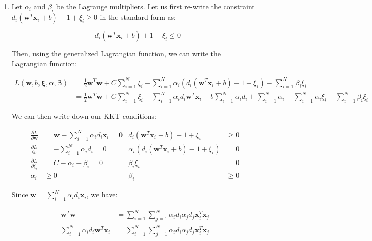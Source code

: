 \documentclass[11pt,fancychapters]{article}
\begin{document}
\begin{enumerate}[label=\textbf{\arabic*)}]

\item Let $\alpha_i$ and $\beta_i$ be the Lagrange multipliers. Let us first re-write the constraint $d_i(\mathbf{w}^T\mathbf{x}_i + b) - 1 + \xi_i \ge 0$ in the standard form as:

\begin{equation*}
	-d_i(\mathbf{w}^T\mathbf{x}_i + b) + 1 - \xi_i \le 0
\end{equation*}

Then, using the generalized Lagrangian function, we can write the Lagrangian function:

\begin{equation*}
	\begin{split}
	L(\mathbf{w}, b, \mathbf{\xi}, \bm{\alpha}, \bm{\beta}) & = \frac{1}{2} \mathbf{w}^T\mathbf{w} + C\sum_{i=1}^{N}\xi_i - \sum_{i=1}^{N}\alpha_i \left( d_i(\mathbf{w}^T\mathbf{x}_i + b) - 1 + \xi_i \right) - \sum_{i=1}^{N}\beta_i \xi_i \\
	& = \frac{1}{2} \mathbf{w}^T\mathbf{w} + C\sum_{i=1}^{N}\xi_i - \sum_{i=1}^{N}\alpha_i d_i \mathbf{w}^T \mathbf{x}_i - b \sum_{i=1}^{N}\alpha_i d_i + \sum_{i=1}^{N}\alpha_i - \sum_{i=1}^{N}\alpha_i \xi_i - \sum_{i=1}^{N}\beta_i \xi_i
	\end{split}
\end{equation*}

We can then write down our KKT conditions:

\begin{align*}
\frac{\partial L}{\partial \mathbf{w}} &= \mathbf{w} - \sum_{i=1}^{N}\alpha_i d_i \mathbf{x}_i = \mathbf{0} & d_i(\mathbf{w}^T\mathbf{x}_i + b) - 1 + \xi_i &\ge 0 \\
\frac{\partial L}{\partial b} &= - \sum_{i=1}^{N}\alpha_i d_i = 0 & \alpha_i \left( d_i(\mathbf{w}^T\mathbf{x}_i + b) - 1 + \xi_i \right) &= 0 \\
\frac{\partial L}{\partial \xi_i} &= C - \alpha_i - \beta_i = 0 & \beta_i \xi_i &= 0 \\
\alpha_i &\ge 0 & \beta_i &\ge 0
\end{align*}

Since $\mathbf{w} = \sum_{i=1}^{N}\alpha_i d_i \mathbf{x}_i$, we have:

\begin{equation*}
	\begin{split}
		\mathbf{w}^T\mathbf{w} & = \sum_{i=1}^{N}\sum_{j=1}^{N}\alpha_i d_i \alpha_j d_j \mathbf{x}_i^T \mathbf{x}_j \\
		\sum_{i=1}^{N}\alpha_i d_i \mathbf{w}^T \mathbf{x}_i & = \sum_{i=1}^{N}\sum_{j=1}^{N}\alpha_i d_i \alpha_j d_j \mathbf{x}_i^T \mathbf{x}_j
	\end{split}
\end{equation*}


\end{enumerate}
\end{document}
